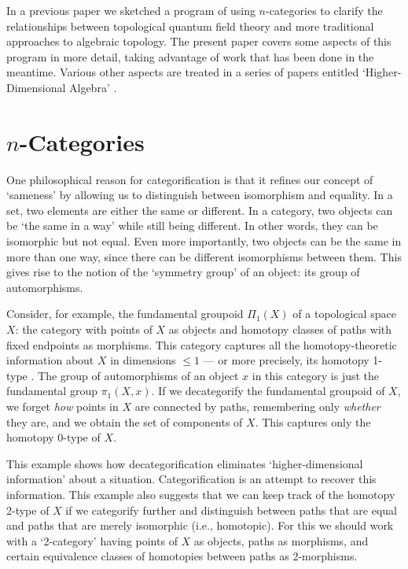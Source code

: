 In a previous paper \cite{BD} we sketched a program of using
$n$-categories to clarify the relationships between topological quantum
field theory and more traditional approaches to algebraic topology.  The
present paper covers some aspects of this program in more detail, taking
advantage of work that has been done in the meantime.  Various other
aspects are treated in a series of papers entitled `Higher-Dimensional
Algebra' \cite{B,BD2,BL,BN}.

\section{$n$-Categories} \label{ncats}

One philosophical reason for categorification is that it refines our
concept of `sameness' by allowing us to distinguish between isomorphism
and equality.  In a set, two elements are either the same or different. 
In a category, two objects can be `the same in a way' while still being
different.  In other words, they can be isomorphic but not equal.  Even
more importantly, two objects can be the same in more than one way,
since there can be different isomorphisms between them.   This gives
rise to the notion of the `symmetry group' of an object: its group of
automorphisms. 

Consider, for example, the fundamental groupoid $\Pi_1(X)$ of a 
topological space $X$: the category with points of $X$ as objects and
homotopy classes of paths with fixed endpoints as morphisms.  This
category captures all the homotopy-theoretic information about $X$ in
dimensions $\le 1$ --- or more precisely, its homotopy 1-type
\cite{Baues}.   The group of automorphisms of an object $x$ in this
category is just the fundamental group $\pi_1(X,x)$.  If we decategorify
the fundamental groupoid of $X$, we forget {\it how} points in $X$ are
connected by paths, remembering only {\it whether} they are, and we
obtain the set of components of $X$.   This captures only the homotopy
0-type of $X$.  

This example shows how decategorification eliminates `higher-dimensional
information' about a situation.   Categorification is an attempt to
recover this information.  This example also suggests that we can keep
track of the homotopy 2-type of $X$ if we categorify further and 
distinguish between paths that are equal and paths that are merely
isomorphic (i.e., homotopic).   For this we should work with a
`2-category' having points of $X$ as objects, paths as morphisms, and
certain equivalence classes of homotopies between paths as 2-morphisms. 

